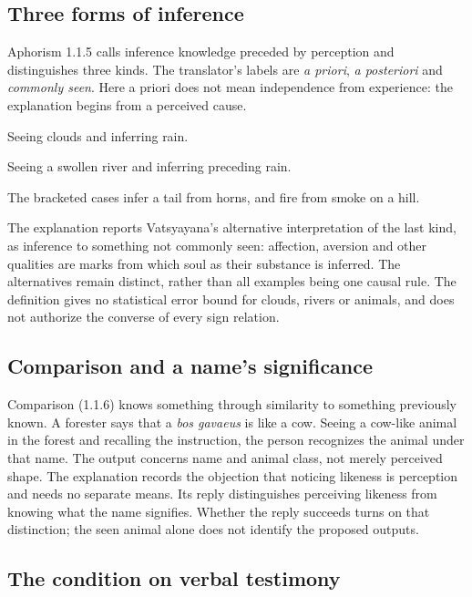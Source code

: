 \subsection{Three forms of inference}

Aphorism 1.1.5 calls inference knowledge preceded by perception and distinguishes
three kinds. The translator's labels are \emph{a priori}, \emph{a posteriori}
and \emph{commonly seen}. Here a priori does not mean independence from
experience: the explanation begins from a perceived cause.

\begin{description}[style=nextline,leftmargin=0pt]
 \item[From perceived cause to effect.] Seeing clouds and inferring rain.
 \item[From perceived effect to cause.] Seeing a swollen river and inferring
 preceding rain.
 \item[From commonly observed association.] The bracketed cases infer a tail
 from horns, and fire from smoke on a hill.
\end{description}

The explanation reports Vatsyayana's alternative interpretation of the last
kind, as inference to something not commonly seen: affection, aversion and
other qualities are marks from which soul as their substance is inferred.
The alternatives remain distinct, rather than all examples being one causal
rule. The definition gives no statistical error bound for clouds, rivers or
animals, and does not authorize the converse of every sign relation.

\subsection{Comparison and a name's significance}

Comparison (1.1.6) knows something through similarity to something previously
known. A forester says that a \emph{bos gavaeus} is like a cow. Seeing a
cow-like animal in the forest and recalling the instruction, the person
recognizes the animal under that name. The output concerns name and animal
class, not merely perceived shape.
The explanation records the objection that noticing likeness is perception
and needs no separate means. Its reply distinguishes perceiving likeness
from knowing what the name signifies. Whether the reply succeeds turns on
that distinction; the seen animal alone does not identify the proposed outputs.

\subsection{The condition on verbal testimony}

